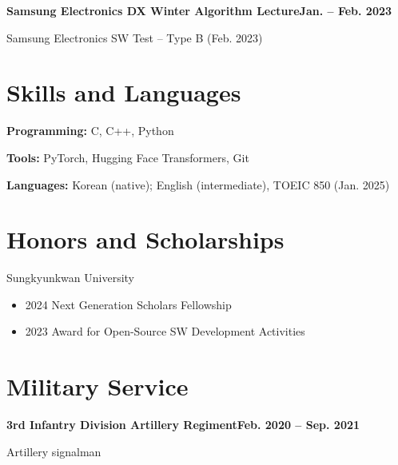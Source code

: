 \documentclass[10pt,a4paper]{article}
\begin{document}
\medskip
\textbf{Samsung Electronics DX Winter Algorithm Lecture}\hfill \textbf{Jan. -- Feb. 2023}\par
Samsung Electronics SW Test -- Type B (Feb. 2023)

\section*{Skills and Languages}
\textbf{Programming:} C, C++, Python\par
\textbf{Tools:} PyTorch, Hugging Face Transformers, Git\par
\textbf{Languages:} Korean (native); English (intermediate), TOEIC 850 (Jan. 2025)

\section*{Honors and Scholarships}
Sungkyunkwan University
\begin{itemize}
  \item 2024 Next Generation Scholars Fellowship
  \item 2023 Award for Open-Source SW Development Activities
\end{itemize}

\section*{Military Service}
\textbf{3rd Infantry Division Artillery Regiment}\hfill \textbf{Feb. 2020 -- Sep. 2021}\par
Artillery signalman
\end{document}
